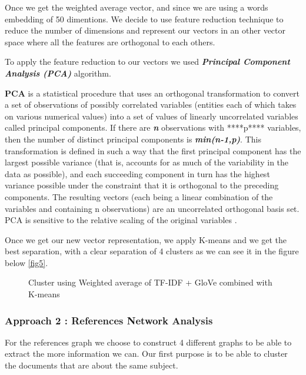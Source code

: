 \documentclass[article,twocolumn]{IEEEtran}
\begin{document}
Once we get the weighted average vector, and since we are using a words
embedding of 50 dimentions. We decide to use feature reduction technique
to reduce the number of dimensions and represent our vectors in an other
vector space where all the features are orthogonal to each others.

To apply the feature reduction to our vectors we used
\textbf{\emph{Principal Component Analysis (PCA)}} algorithm.

\textbf{PCA} is a statistical procedure that uses an orthogonal
transformation to convert a set of observations of possibly correlated
variables (entities each of which takes on various numerical values)
into a set of values of linearly uncorrelated variables called principal
components. If there are \textbf{\emph{n}} observations with ****p****
variables, then the number of distinct principal components is
\textbf{\emph{min(n-1,p)}}. This transformation is defined in such a way
that the first principal component has the largest possible variance
(that is, accounts for as much of the variability in the data as
possible), and each succeeding component in turn has the highest
variance possible under the constraint that it is orthogonal to the
preceding components. The resulting vectors (each being a linear
combination of the variables and containing n observations) are an
uncorrelated orthogonal basis set. PCA is sensitive to the relative
scaling of the original variables \cite{PCA}.

Once we get our new vector representation, we apply K-means and we get
the best separation, with a clear separation of 4 clusters as we can see
it in the figure below \ref{fig5}.


    \begin{figure}
        \begin{center}\end{center}
        \caption{Cluster using Weighted average of TF-IDF + GloVe  combined with K-means }
        \label{fig}
    \end{figure}
    
    \hypertarget{approach-2-references-network-analysis}{%
\subsubsection{Approach 2 : References Network
Analysis}\label{approach-2-references-network-analysis}}

For the references graph we choose to construct 4 different graphs to be
able to extract the more information we can. Our first purpose is to be
able to cluster the documents that are about the same subject.
\end{document}
